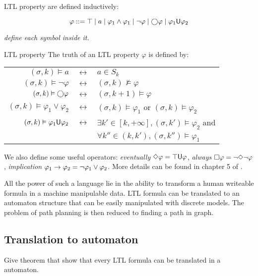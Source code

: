 LTL property are defined inductively:

$$ \varphi ::= 
\top \mid 
a \mid 
\varphi_1 \land \varphi_1 \mid
\lnot \varphi \mid
\bigcirc \varphi \mid
\varphi_1 \mathsf{U} \varphi_2$$

\textit{define each symbol inside it.}

\begin{nameddef}{LTL property}
The truth of an LTL property $\varphi$ is defined by:
\begin{tabular}[b]{rcl}
$(\sigma,k) \vDash a$ & $\leftrightarrow$ & $a \in S_k$\\
$(\sigma,k) \vDash \lnot \varphi$ & $\leftrightarrow$ &  $(\sigma,k) \nvDash  \varphi$ \\
$(\sigma,k) \vDash \bigcirc \varphi$ & $\leftrightarrow$ &  $(\sigma,k+1) \vDash  \varphi$ \\
$(\sigma,k) \vDash \varphi_1 \lor \varphi_2$ & $\leftrightarrow$ &  $(\sigma,k) \vDash  \varphi_1$ or $(\sigma,k) \vDash  \varphi_2$ \\
$(\sigma,k) \vDash \varphi_1 \mathsf{U} \varphi_2$ & $\leftrightarrow$ &  $\exists k' \in \left [k, +\infty \right ] , (\sigma,k') \vDash \varphi_2$ and \\
& & $\forall k'' \in (k,k'), (\sigma,k'') \vDash \varphi_1$ \\
\end{tabular}
\end{nameddef}

We also define some useful operators: \textit{eventually} $\Diamond \varphi = \top \mathsf{U} \varphi$, \textit{always} $\square \varphi = \lnot \Diamond \lnot \varphi$, \textit{implication} $\varphi_1 \rightarrow \varphi_2 = \lnot \varphi_1 \lor \varphi_2$.
More details can be found in chapter 5 of \cite{principlemodelchecking}.

All the power of such a language lie in the ability to transform a human writeable formula in a machine manipulable data. LTL formula can be translated to an automaton structure that can be easily manipulated with discrete models. The problem of path planning is then reduced to finding a path in graph.

\subsection{Translation to \buchi{} automaton}

Give theorem that show that every LTL formula can be translated in a \buchi{} automaton.

